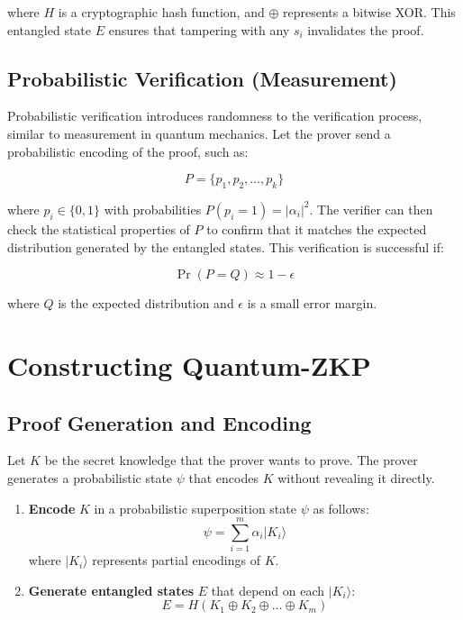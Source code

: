\documentclass{article.cls}
\begin{document}
where $H$ is a cryptographic hash function, and $\oplus$ represents a bitwise XOR. This entangled state $E$ ensures that tampering with any $s_i$ invalidates the proof.

\subsection{Probabilistic Verification (Measurement)}
Probabilistic verification introduces randomness to the verification process, similar to measurement in quantum mechanics. Let the prover send a probabilistic encoding of the proof, such as:

\begin{equation}
P = \{p_1, p_2, \dots, p_k\}
\end{equation}

where $p_i \in \{0, 1\}$ with probabilities $P(p_i = 1) = \vert \alpha_i \vert^2$. The verifier can then check the statistical properties of $P$ to confirm that it matches the expected distribution generated by the entangled states. This verification is successful if:

\begin{equation}
\Pr(P = Q) \approx 1 - \epsilon
\end{equation}

where $Q$ is the expected distribution and $\epsilon$ is a small error margin.

\section{Constructing Quantum-ZKP}
\subsection{Proof Generation and Encoding}
Let $K$ be the secret knowledge that the prover wants to prove. The prover generates a probabilistic state $\psi$ that encodes $K$ without revealing it directly.

\begin{enumerate}
    \item \textbf{Encode} $K$ in a probabilistic superposition state $\psi$ as follows:
    \begin{equation}
    \psi = \sum_{i=1}^m \alpha_i \vert K_i \rangle
    \end{equation}
    where $\vert K_i \rangle$ represents partial encodings of $K$.
    \item \textbf{Generate entangled states} $E$ that depend on each $\vert K_i \rangle$:
    \begin{equation}
    E = H(K_1 \oplus K_2 \oplus \dots \oplus K_m)
    \end{equation}
\end{enumerate}
\end{document}
